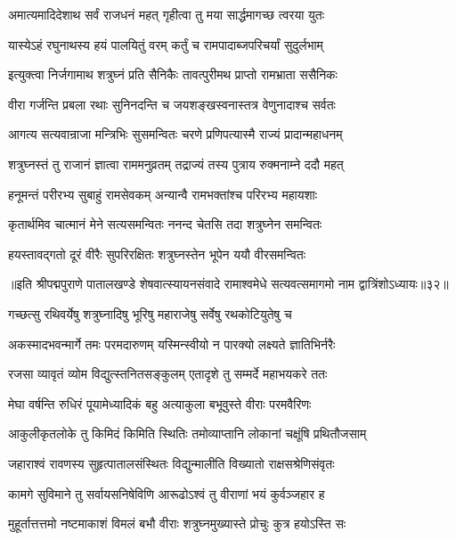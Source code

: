 \twolineshloka
{अमात्यमादिदेशाथ सर्वं राजधनं महत्}
{गृहीत्वा तु मया सार्द्धमागच्छ त्वरया युतः}%

\twolineshloka
{यास्येऽहं रघुनाथस्य हयं पालयितुं वरम्}
{कर्तुं च रामपादाब्जपरिचर्यां सुदुर्लभाम्}%

\twolineshloka
{इत्युक्त्वा निर्जगामाथ शत्रुघ्नं प्रति सैनिकैः}
{तावत्पुरीमथ प्राप्तो रामभ्राता ससैनिकः}%

\twolineshloka
{वीरा गर्जन्ति प्रबला रथाः सुनिनदन्ति च}
{जयशङ्खस्वनास्तत्र वेणुनादाश्च सर्वतः}%

\twolineshloka
{आगत्य सत्यवान्राजा मन्त्रिभिः सुसमन्वितः}
{चरणे प्रणिपत्यास्मै राज्यं प्रादान्महाधनम्}%

\twolineshloka
{शत्रुघ्नस्तं तु राजानं ज्ञात्वा राममनुव्रतम्}
{तद्राज्यं तस्य पुत्राय रुक्मनाम्ने ददौ महत्}%

\twolineshloka
{हनूमन्तं परीरभ्य सुबाहुं रामसेवकम्}
{अन्यान्वै रामभक्तांश्च परिरभ्य महायशाः}%

\twolineshloka
{कृतार्थमिव चात्मानं मेने सत्यसमन्वितः}
{ननन्द चेतसि तदा शत्रुघ्नेन समन्वितः}%

\twolineshloka
{हयस्तावद्गतो दूरं वीरैः सुपरिरक्षितः}
{शत्रुघ्नस्तेन भूपेन ययौ वीरसमन्वितः}%

{॥इति श्रीपद्मपुराणे पातालखण्डे शेषवात्स्यायनसंवादे रामाश्वमेधे सत्यवत्समागमो नाम द्वात्रिंशोऽध्यायः॥३२॥}

\resetShloka


\twolineshloka
{गच्छत्सु रथिवर्येषु शत्रुघ्नादिषु भूरिषु}
{महाराजेषु सर्वेषु रथकोटियुतेषु च}%

\twolineshloka
{अकस्मादभवन्मार्गे तमः परमदारुणम्}
{यस्मिन्स्वीयो न पारक्यो लक्ष्यते ज्ञातिभिर्नरैः}%

\twolineshloka
{रजसा व्यावृतं व्योम विद्युत्स्तनितसङ्कुलम्}
{एतादृशे तु सम्मर्दे महाभयकरे ततः}%

\twolineshloka
{मेघा वर्षन्ति रुधिरं पूयामेध्यादिकं बहु}
{अत्याकुला बभूवुस्ते वीराः परमवैरिणः}%

\twolineshloka
{आकुलीकृतलोके तु किमिदं किमिति स्थितिः}
{तमोव्याप्तानि लोकानां चक्षूंषि प्रथितौजसाम्}%

\twolineshloka
{जहाराश्वं रावणस्य सुहृत्पातालसंस्थितः}
{विद्युन्मालीति विख्यातो राक्षसश्रेणिसंवृतः}%

\twolineshloka
{कामगे सुविमाने तु सर्वायसनिषेविणि}
{आरूढोऽश्वं तु वीराणां भयं कुर्वञ्जहार ह}%

\twolineshloka
{मुहूर्तात्तत्तमो नष्टमाकाशं विमलं बभौ}
{वीराः शत्रुघ्नमुख्यास्ते प्रोचुः कुत्र हयोऽस्ति सः}%

